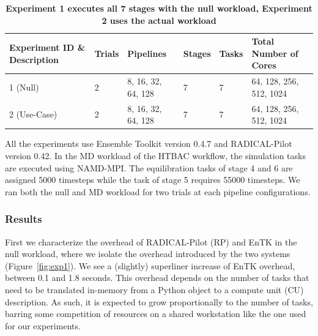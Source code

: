 \begin{table}[t]
\centering
\caption{\bf Experiment 1 executes all 7 stages with the null workload, Experiment 2 uses the actual workload}
\label{tab:exp}
\begin{tabular}{llllll}
\hline
\multicolumn{1}{l|}{Experiment ID \& Description} & \multicolumn{1}{l|}{Trials} & \multicolumn{1}{l|}{Pipelines} & \multicolumn{1}{l}{Stages} & \multicolumn{1}{l|}{Tasks} & \multicolumn{1}{l}{Total Number of Cores} \\ \hline
1 (Null)                                           & 2                           & 8, 16, 32, 64, 128             & 7                           & 7                          & 64, 128, 256, 512, 1024                    \\ \hline
2 (Use-Case)                                       & 2                           & 8, 16, 32, 64, 128             & 7                           & 7                          & 64, 128, 256, 512, 1024                    \\ \hline
\end{tabular}
\end{table}


All the experiments use Ensemble Toolkit version 0.4.7 and RADICAL-Pilot
version 0.42. In the MD workload of the HTBAC workflow, the simulation tasks
are executed using NAMD-MPI\@. The equilibration %
tasks of stage 4 and 6 are assigned 5000 timesteps while the task of stage 5
requires 55000 timesteps. We ran both the null and MD workload for two trials
at each pipeline configurations.

\subsubsection{Results}\label{ssec:exp_results}

First we characterize the overhead of RADICAL-Pilot (RP) and EnTK in the 
null workload, where we isolate the %
overhead introduced by the two %
systems (Figure~\ref{fig:exp1}). We see a (slightly) superliner
increase of EnTK overhead, between 0.1 and 1.8 seconds. This overhead depends
on the number of tasks that need to be translated in-memory from a Python
object to a compute unit (CU) description. As such, it is expected to grow
proportionally to the number of tasks, barring some competition of resources
on a shared workstation like the one used for our experiments.

